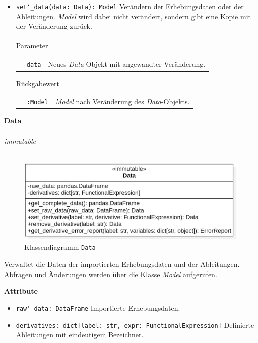 \documentclass{article}
\begin{document}
\begin{itemize}
\item \texttt{set\char`_data(data: Data): Model} \newline Verändern der Erhebungsdaten oder der Ableitungen. \textit{Model} wird dabei nicht verändert, sondern gibt eine Kopie mit der Veränderung zurück.
\\\\
\underline{{Parameter}}

\begin{tabular}{lll}
 & \texttt{data} & Neues \textit{Data}-Objekt mit angewandter Veränderung. \\
\end{tabular}

\underline{{Rückgabewert}}

\begin{tabular}{lll}
 & \texttt{:Model} & \textit{Model} nach Veränderung des \textit{Data}-Objekts. \\
\end{tabular}
\end{itemize}

\newpage
\textbf{\large{Data}}\\\\
\textit{\flqq{}immutable\frqq}\normalsize\\\\
\begin{figure}[H]%
    \centering
    \includegraphics[width=13cm]{entwurf/Entwurf_dokument/img/cls/model/Data.png}
    \caption{Klassendiagramm \texttt{Data}}
\end{figure}

Verwaltet die Daten der importierten Erhebungsdaten und der Ableitungen. Abfragen und Änderungen werden über die Klasse \textit{Model} aufgerufen.
\newline \newline

\textbf{{Attribute}}
\begin{itemize}
\item \texttt{raw\char`_data: DataFrame} \newline Importierte Erhebungsdaten.
\item \texttt{derivatives: dict[label: str, expr: FunctionalExpression]} \newline Definierte Ableitungen mit eindeutigem Bezeichner.
\\\\
\end{itemize}
\end{document}
